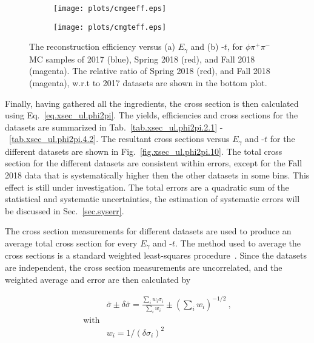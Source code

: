 \begin{figure}[H]
    \centering
    \begin{subfigure}[b]{0.5\textwidth}
        \texttt{[image: plots/cmgeeff.eps]}
        \caption{}
        \label{fig.xsec_ul.phi2pi.9.a}
    \end{subfigure}\hfill
    \begin{subfigure}[b]{0.5\textwidth}
        \texttt{[image: plots/cmgteff.eps]}
        \caption{}
        \label{fig.xsec_ul.phi2pi.9.b}
    \end{subfigure}
    \caption{\label{fig.xsec_ul.phi2pi.9}The reconstruction efficiency versus (a) $E_{\gamma}$ and (b) -$t$, for $\phi \pi^+ \pi^-$ MC samples of 2017 (blue), Spring 2018 (red), and Fall 2018 (magenta). The relative ratio of Spring 2018 (red), and Fall 2018 (magenta), w.r.t to 2017 datasets are shown in the bottom plot.}
\end{figure}

Finally, having gathered all the ingredients, the cross section is then calculated using Eq.~\ref{eq.xsec_ul.phi2pi}. The yields, efficiencies and cross sections for the datasets are summarized in Tab.~\ref{tab.xsec_ul.phi2pi.2.1} -~\ref{tab.xsec_ul.phi2pi.4.2}. The resultant cross sections versus $E_{\gamma}$ and -$t$ for the different datasets are shown in Fig.~\ref{fig.xsec_ul.phi2pi.10}. The total cross section for the different datasets are consistent within errors, except for the Fall 2018 data that is systematically higher then the other datasets in some bins. This effect is still under investigation. The total errors are a quadratic sum of the statistical and systematic uncertainties, the estimation of systematic errors will be discussed in Sec.~\ref{sec.syserr}.
~\par The cross section measurements for different datasets are used to produce an average total cross section for every $E_{\gamma}$ and -$t$. The method used to average the cross sections is a standard weighted least-squares procedure~\cite{Tanabashi18}. Since the datasets are independent, the cross section measurements are uncorrelated, and the weighted average and error are then calculated by

\begin{equation}
    \label{eq.xsec_ul.phi2pi.2}
    \begin{aligned}
        & \bar{\sigma} \pm \delta\bar{\sigma} = \frac{\sum_{i}w_{i}\sigma_{i}}{\sum_{i}w_{i}} \pm  \left(\sum_{i}w_{i}\right)^{-1/2}~, \\
        \mathrm{with}\\
        & w_{i} = 1/(\delta \sigma_{i})^2
    \end{aligned}
\end{equation}

